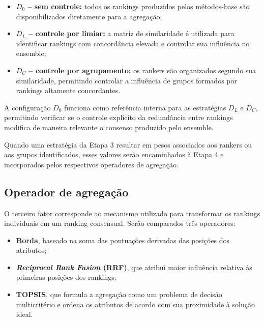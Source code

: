 \begin{itemize}

    \item \textbf{$D_0$ -- sem controle:}
    todos os rankings produzidos pelos métodos-base são disponibilizados
    diretamente para a agregação;

    \item \textbf{$D_L$ -- controle por limiar:}
    a matriz de similaridade é utilizada para identificar rankings com
    concordância elevada e controlar sua influência no ensemble;

    \item \textbf{$D_C$ -- controle por agrupamento:}
    os rankers são organizados segundo sua similaridade, permitindo controlar
    a influência de grupos formados por rankings altamente concordantes.

\end{itemize}

A configuração $D_0$ funciona como referência interna para as estratégias
$D_L$ e $D_C$, permitindo verificar se o controle explícito da redundância
entre rankings modifica de maneira relevante o consenso produzido pelo
ensemble.

Quando uma estratégia da Etapa 3 resultar em pesos associados aos rankers ou
aos grupos identificados, esses valores serão encaminhados à Etapa 4 e
incorporados pelos respectivos operadores de agregação.


\subsection{Operador de agregação}
\label{subsec:ac-efs-config-agregacao}

O terceiro fator corresponde ao mecanismo utilizado para transformar os
rankings individuais em um ranking consensual. Serão comparados três
operadores:

\begin{itemize}

    \item \textbf{Borda}, baseado na soma das pontuações derivadas das posições
    dos atributos;

    \item \textbf{\textit{Reciprocal Rank Fusion} (RRF)}, que atribui maior
    influência relativa às primeiras posições dos rankings;

    \item \textbf{TOPSIS}, que formula a agregação como um problema de decisão
    multicritério e ordena os atributos de acordo com sua proximidade à
    solução ideal.

\end{itemize}


